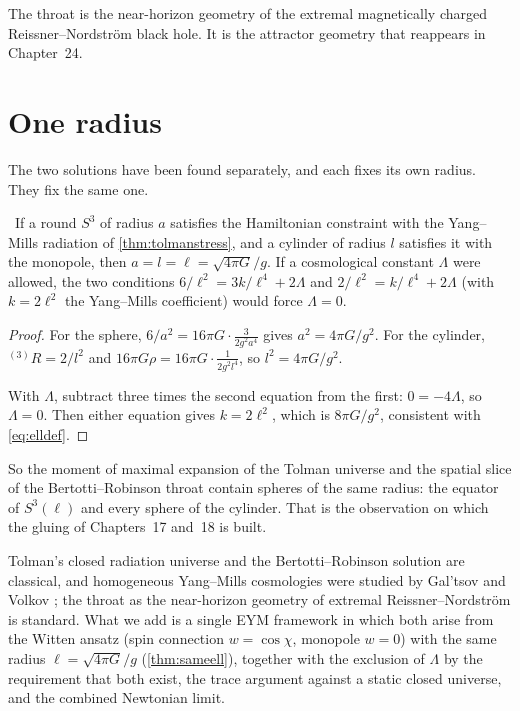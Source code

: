 The throat is the near-horizon geometry of the extremal magnetically charged Reissner--Nordstr\"om black hole. It is the attractor geometry that reappears in Chapter~24.

\section{One radius}

The two solutions have been found separately, and each fixes its own radius. They fix the same one.

\begin{theorem}\label{thm:sameell}\ver\
If a round $S^3$ of radius $a$ satisfies the Hamiltonian constraint with the Yang--Mills radiation of \cref{thm:tolmanstress}, and a cylinder of radius $l$ satisfies it with the monopole, then $a=l=\ell=\sqrt{4\pi G}/g$. If a cosmological constant $\Lambda$ were allowed, the two conditions $6/\ell^2=3k/\ell^4+2\Lambda$ and $2/\ell^2=k/\ell^4+2\Lambda$ (with $k=2\ell^2$ the Yang--Mills coefficient) would force $\Lambda=0$.
\end{theorem}
\begin{proof}
For the sphere, $6/a^2=16\pi G\cdot\frac3{2g^2a^4}$ gives $a^2=4\pi G/g^2$. For the cylinder, ${}^{(3)}R=2/l^2$ and $16\pi G\rho=16\pi G\cdot\frac1{2g^2l^4}$, so $l^2=4\pi G/g^2$.

With $\Lambda$, subtract three times the second equation from the first: $0=-4\Lambda$, so $\Lambda=0$. Then either equation gives $k=2\ell^2$, which is $8\pi G/g^2$, consistent with \eqref{eq:elldef}.
\end{proof}


So the moment of maximal expansion of the Tolman universe and the spatial slice of the Bertotti--Robinson throat contain spheres of the same radius: the equator of $S^3(\ell)$ and every sphere of the cylinder. That is the observation on which the gluing of Chapters~17 and~18 is built.

\begin{litbox}
Tolman's closed radiation universe \cite{Tolman1934} and the Bertotti--Robinson solution \cite{Bertotti1959,Robinson1959} are classical, and homogeneous Yang--Mills cosmologies were studied by Gal'tsov and Volkov \cite{GaltsovVolkov1991}; the throat as the near-horizon geometry of extremal Reissner--Nordstr\"om is standard. What we add is a single EYM framework in which both arise from the Witten ansatz (spin connection $w=\cos\chi$, monopole $w=0$) with the same radius $\ell=\sqrt{4\pi G}/g$ (\cref{thm:sameell}), together with the exclusion of $\Lambda$ by the requirement that both exist, the trace argument against a static closed universe, and the combined Newtonian limit.
\end{litbox}

